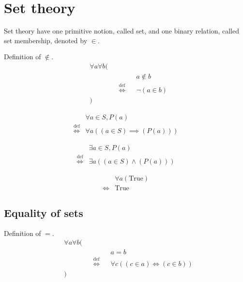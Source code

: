 \chapter{Set theory}
Set theory have one primitive notion, called set, and one binary relation, called set membership, denoted by $\in$.

\begin{defn}
\label{Definition:notin}
Definition of $\notin$.
\begin{align*}
& \forall a \forall b ( \\
& \quad && && a \notin b \\
& \quad && \overset{\operatorname{def}}{\iff} && \lnot (a \in b) \\
& )
\end{align*}
\end{defn}

\begin{defn}
\begin{align*}
& \forall a \in S, P(a) \\
\overset{\operatorname{def}}{\iff} & \forall a ((a \in S) \implies (P(a)))
\end{align*}
\end{defn}

\begin{defn}
\begin{align*}
& \exists a \in S, P(a) \\
\overset{\operatorname{def}}{\iff} & \exists a ((a \in S) \land (P(a)))
\end{align*}
\end{defn}

\begin{prop}
\label{Proposition:forall_true}
\begin{align*}
& \forall a (\text{True}) \\
\iff & \text{True}
\end{align*}
\end{prop}

\section{Equality of sets}
\begin{defn}
\label{Definition:equality}
Definition of $=$.
\begin{align*}
& \forall a \forall b ( \\
& \quad && && a = b \\
& \quad && \overset{\operatorname{def}}{\iff} && \forall c ((c \in a) \iff (c \in b)) \\
& )
\end{align*}
\end{defn}

